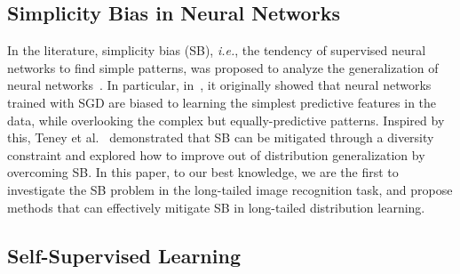 \documentclass[10pt,journal,compsoc]{IEEEtran}
\newcommand{\ie}{\emph{i.e.}}
\begin{document}
\subsection{Simplicity Bias in Neural Networks}

In the literature, simplicity bias (SB), \ie, the tendency of supervised neural networks to find simple patterns, was proposed to analyze the generalization of neural networks~\cite{simpBiasNIPs20,huh2021low}. In particular, in~\cite{simpBiasNIPs20}, it originally showed that neural networks trained with SGD are biased to learning the simplest predictive features in the data, while overlooking the complex but equally-predictive patterns. Inspired by this, Teney et al.~\cite{OOD} demonstrated that SB can be mitigated through a diversity constraint and explored how to improve out of distribution generalization by overcoming SB. In this paper, to our best knowledge, we are the first to investigate the SB problem in the long-tailed image recognition task, and propose methods that can effectively mitigate SB in long-tailed distribution learning.

\subsection{Self-Supervised Learning}
\end{document}
